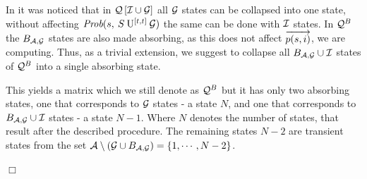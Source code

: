 \documentclass[a4paper,11pt]{article}
\newenvironment{proof}{\trivlist \item[\hskip \labelsep{\bf Proof}]}{\hfill\hbox{$\Box$}\endtrivlist}
\begin{document}
	\begin{proof}
		In \cite{KatoenKNP_LNCS01} it was noticed that in $\mathcal{Q}\left[ \mathcal{I} \cup \mathcal{G} \right]$ all $\mathcal{G}$ states can be collapsed into one state, without affecting $\mbox{\it Prob}(s, \: S \: \mathrm{U}^{[t,t]} \: \mathcal{G} )$ the same can be done with $\mathcal{I}$ states. In $\mathcal{Q}^{B}$ the $B_{ \mathcal{A}, \mathcal{G} }$ states are also made absorbing, as this does not affect $\overrightarrow{p(s,i)}$, we are computing. Thus, as a trivial extension, we suggest to collapse all $B_{ \mathcal{A}, \mathcal{G} } \cup \mathcal{I}$ states of $\mathcal{Q}^{B}$ into a single absorbing state.
		 
		This yields a matrix which we still denote as $\mathcal{Q}^{B}$ but it has only two absorbing states, one that corresponds to $\mathcal{G}$ states - a state $N$, and one that corresponds to $B_{ \mathcal{A}, \mathcal{G} } \cup \mathcal{I}$ states - a state $N-1$. Where $N$ denotes the number of states, that result after the described procedure. The remaining states $N-2$ are transient states from the set $\mathcal{A} \setminus \left( \mathcal{G} \cup B_{ \mathcal{A}, \mathcal{G} } \right) = \{ 1,\cdots,N-2 \}$.
		

\end{proof}
\end{document}
